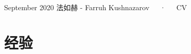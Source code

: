 \documentclass[11pt, a4paper]{awesome-cv}
\begin{document}
\makecvheader

\makecvfooter
  {September 2020}
    {法如赫 - Farruh Kushnazarov~~~·~~~CV}
  {\thepage}





\hypertarget{ux7ecfux9a8c}{%
\section{经验}\label{ux7ecfux9a8c}}
\end{document}
